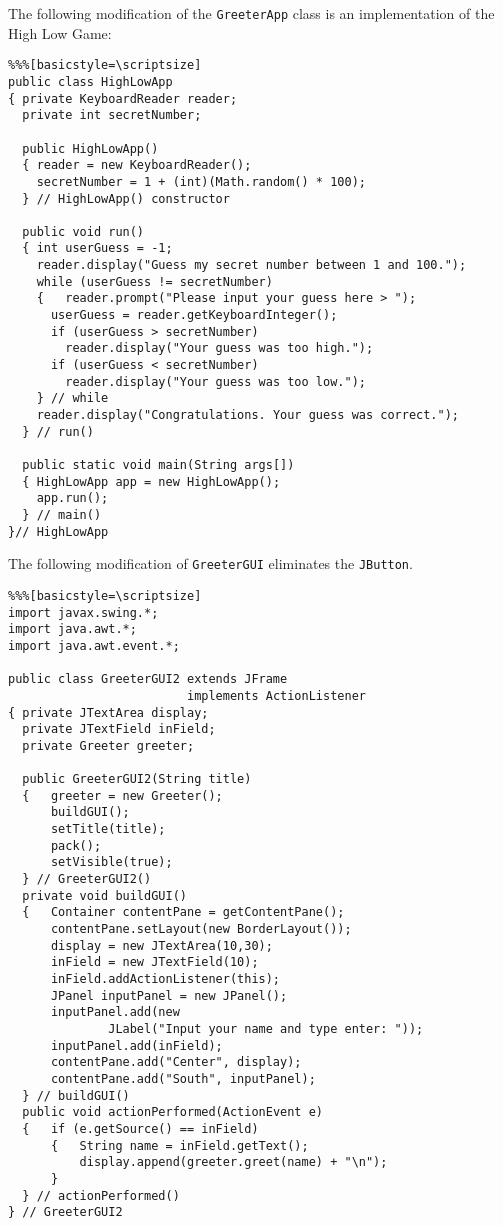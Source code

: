 \pagebreak
\secANSH
\begin{ANS}
\item The following modification of the {\tt GreeterApp} class
is an implementation of the High Low Game:

\begin{jjjlisting}[29pc]
\begin{lstlisting}%%%[basicstyle=\scriptsize]
public class HighLowApp 
{ private KeyboardReader reader;
  private int secretNumber;

  public HighLowApp() 
  { reader = new KeyboardReader();
    secretNumber = 1 + (int)(Math.random() * 100);
  } // HighLowApp() constructor
    
  public void run() 
  { int userGuess = -1;
    reader.display("Guess my secret number between 1 and 100.");
    while (userGuess != secretNumber)
    {   reader.prompt("Please input your guess here > ");
      userGuess = reader.getKeyboardInteger();
      if (userGuess > secretNumber)
        reader.display("Your guess was too high.");
      if (userGuess < secretNumber)
        reader.display("Your guess was too low.");
    } // while
    reader.display("Congratulations. Your guess was correct.");
  } // run()
     
  public static void main(String args[]) 
  { HighLowApp app = new HighLowApp();
    app.run();
  } // main()
}// HighLowApp
\end{lstlisting}
\end{jjjlisting}

\item The following modification of {\tt GreeterGUI} eliminates the {\tt JButton}.

\begin{jjjlisting}
\begin{lstlisting}%%%[basicstyle=\scriptsize]
import javax.swing.*;
import java.awt.*;
import java.awt.event.*;

public class GreeterGUI2 extends JFrame 
                         implements ActionListener 
{ private JTextArea display;
  private JTextField inField;
  private Greeter greeter;
	    
  public GreeterGUI2(String title) 
  {   greeter = new Greeter();  
      buildGUI();
      setTitle(title);
      pack();
      setVisible(true);
  } // GreeterGUI2()
  private void buildGUI() 
  {   Container contentPane = getContentPane();
      contentPane.setLayout(new BorderLayout());
      display = new JTextArea(10,30);
      inField = new JTextField(10);
      inField.addActionListener(this);
      JPanel inputPanel = new JPanel();
      inputPanel.add(new 
              JLabel("Input your name and type enter: "));
      inputPanel.add(inField);
      contentPane.add("Center", display);
      contentPane.add("South", inputPanel);
  } // buildGUI()
  public void actionPerformed(ActionEvent e) 
  {   if (e.getSource() == inField) 
      {   String name = inField.getText();
          display.append(greeter.greet(name) + "\n");
      }
  } // actionPerformed()
} // GreeterGUI2
\end{lstlisting}
\end{jjjlisting}


\end{ANS}
